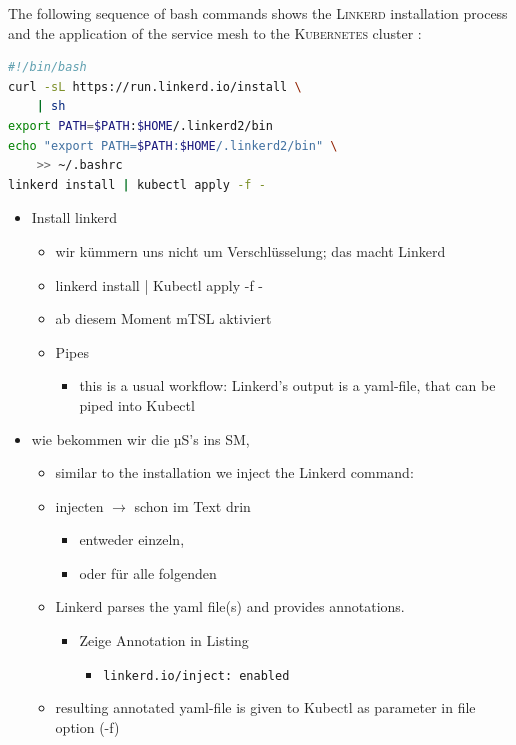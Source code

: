 The following sequence of bash commands shows the \textsc{Linkerd} installation process and the application of the service mesh to the \textsc{Kubernetes} cluster \cite{linkerd-get-started}:
\begin{lstlisting}[language=bash,caption={Setup of \textsc{Linkerd}}, label={lst:linkerd-setup}]
#!/bin/bash
curl -sL https://run.linkerd.io/install \
	| sh
export PATH=$PATH:$HOME/.linkerd2/bin
echo "export PATH=$PATH:$HOME/.linkerd2/bin" \
	>> ~/.bashrc
linkerd install | kubectl apply -f -
\end{lstlisting}

\begin{itemize}
	\item Install linkerd
\begin{itemize}
	\item wir kümmern uns nicht um Verschlüsselung; das macht Linkerd
	\item linkerd install | Kubectl apply -f -
	\item ab diesem Moment mTSL aktiviert
	\item Pipes
\begin{itemize}
	\item this is a usual workflow: Linkerd’s output is a yaml-file, that can be piped into Kubectl 
\end{itemize}
\end{itemize}
	\item wie bekommen wir die µS's ins SM, 
\begin{itemize}
	\item similar to the installation we inject the Linkerd command:
	\item injecten $\rightarrow$ schon im Text drin
\begin{itemize}
	\item entweder einzeln, 
	\item oder für alle folgenden
\end{itemize}
	\item Linkerd parses the yaml file(s) and provides annotations.
\begin{itemize}
	\item Zeige Annotation in Listing
\begin{itemize}
	\item \lstinline|linkerd.io/inject: enabled|
\end{itemize}
\end{itemize}
	\item resulting annotated yaml-file is given to Kubectl as parameter in file option (-f)

\end{itemize}
\end{itemize}

